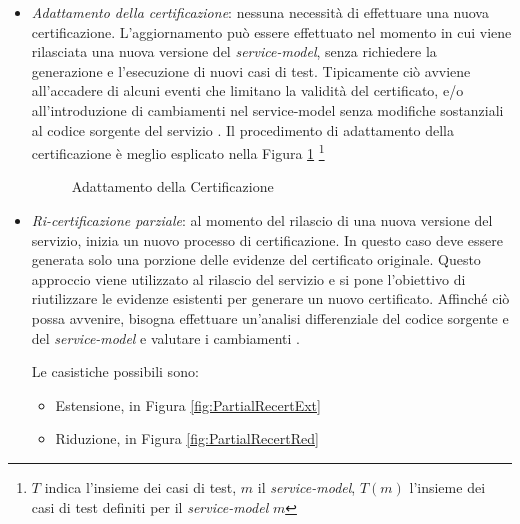 \documentclass[../main.tex]{subfiles}
\begin{document}
\begin{itemize}
\item \textit{Adattamento della certificazione}: nessuna necessità di effettuare una nuova certificazione. L'aggiornamento può essere effettuato nel momento in cui viene rilasciata una nuova versione del \textit{service-model}, senza richiedere la generazione e l'esecuzione di nuovi casi di test.
Tipicamente ciò avviene all'accadere di alcuni eventi che limitano la validità del certificato, e/o all'introduzione di cambiamenti nel service-model senza modifiche sostanziali al codice sorgente del servizio \cite{CertEvolutiva}.
Il procedimento di adattamento della certificazione è meglio esplicato nella Figura \ref{fig:AdattamCert} \footnote{$T$ indica l'insieme dei casi di test, $m$ il \textit{service-model}, $T(m)$ l'insieme dei casi di test definiti per il \textit{service-model} $m$}

\begin{figure}[H]
\centering
{}
\caption{Adattamento della Certificazione \cite{CertEvolutiva}}\label{fig:AdattamCert}
\end{figure}


\item \textit{Ri-certificazione parziale}: al momento del rilascio di una nuova versione del servizio, inizia un nuovo processo di certificazione. In questo caso deve essere generata solo una porzione delle evidenze del certificato originale.
Questo approccio viene utilizzato al rilascio del servizio e si pone l'obiettivo di riutilizzare le evidenze esistenti per generare un nuovo certificato. Affinché ciò possa avvenire, bisogna effettuare un'analisi differenziale del codice sorgente e del \textit{service-model} e valutare i cambiamenti \cite{CertEvolutiva}.

Le casistiche possibili sono:
\begin{itemize}
\item Estensione, in Figura \ref{fig:PartialRecertExt}
\item Riduzione, in Figura \ref{fig:PartialRecertRed}
\end{itemize}


\end{itemize}
\end{document}
